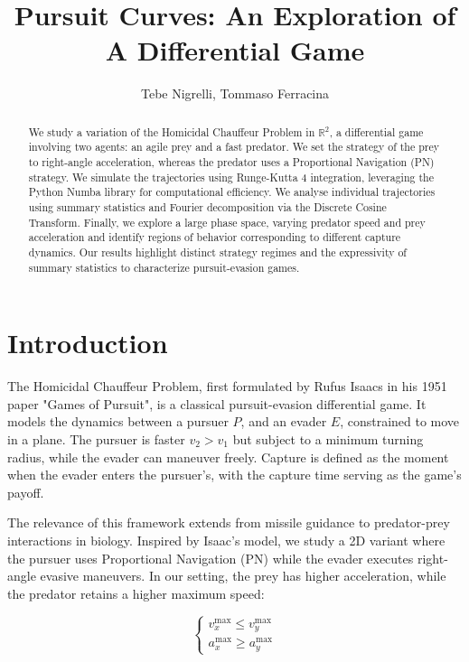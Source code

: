 \documentclass[11pt]{article}
\begin{document}
\title{Pursuit Curves: An Exploration of A Differential Game}
\author{Tebe Nigrelli, Tommaso Ferracina}
\maketitle


\begin{abstract}
We study a variation of the Homicidal Chauffeur Problem in $\mathbb{R}^2$, a differential game involving two agents: an agile prey and a fast predator. We set the strategy of the prey to right-angle acceleration, whereas the predator uses a Proportional Navigation (PN) strategy. We simulate the trajectories using Runge-Kutta 4 integration, leveraging the Python Numba library for computational efficiency. We analyse individual trajectories using summary statistics and Fourier decomposition via the Discrete Cosine Transform. Finally, we explore a large phase space, varying predator speed and prey acceleration and identify regions of behavior corresponding to different capture dynamics. Our results highlight distinct strategy regimes and the expressivity of summary statistics to characterize pursuit-evasion games.
\end{abstract}

\section{Introduction}
The Homicidal Chauffeur Problem, first formulated by Rufus Isaacs in his 1951 paper "Games of Pursuit", is a classical pursuit-evasion differential game. It models the dynamics between a pursuer $P$, and an evader $E$, constrained to move in a plane. The pursuer is faster $v_2 > v_1$ but subject to a minimum turning radius, while the evader can maneuver freely. Capture is defined as the moment when the evader enters the pursuer's, with the capture time serving as the game's payoff.

The relevance of this framework extends from missile guidance to predator-prey interactions in biology. Inspired by Isaac's model, we study a 2D variant where the pursuer uses Proportional Navigation (PN) while the evader executes right-angle evasive maneuvers. In our setting, the prey has higher acceleration, while the predator retains a higher maximum speed:

\[
\left\{
\begin{aligned}
    v^{\text{max}}_x \leq v^{\text{max}}_y \\
    a^{\text{max}}_x \geq a^{\text{max}}_y
\end{aligned}
\right.
\]
\end{document}

